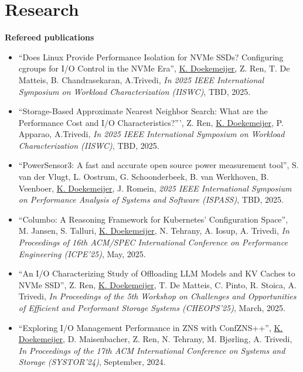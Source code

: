 \documentclass[letterpaper,11pt]{article}
\begin{document}
\section{Research}

\textbf{Refereed publications}
\begin{itemize}[label={}]

\item
  ``Does Linux Provide Performance Isolation for NVMe SSDs? Configuring cgroups for I/O Control in the NVMe Era'', 
  \underline{K. Doekemeijer}, Z. Ren, T. De Matteis, B. Chandrasekaran, A.Trivedi, 
  \textit{In 2025 IEEE International Symposium on Workload Characterization (IISWC)}, 
  TBD, 2025.

\item
  ``Storage-Based Approximate Nearest Neighbor Search: What are the Performance Cost and I/O Characteristics?''', 
  Z. Ren, \underline{K. Doekemeijer},  P. Apparao, A.Trivedi, 
  \textit{In 2025 IEEE International Symposium on Workload Characterization (IISWC)}, 
  TBD, 2025.

\item
  ``PowerSensor3: A fast and accurate open source power measurement tool'', 
  S. van der Vlugt, L. Oostrum, G. Schoonderbeek, B. van Werkhoven, B. Veenboer, \underline{K. Doekemeijer}, J. Romein,
  \textit{2025 IEEE International Symposium on Performance Analysis of Systems and Software (ISPASS)}, 
  TBD, 2025.

\item
  ``Columbo: A Reasoning Framework for Kubernetes’ Configuration Space'', 
  M. Jansen, S. Talluri, \underline{K. Doekemeijer}, N. Tehrany, A. Iosup, A. Trivedi,
  \textit{In Proceedings of 16th ACM/SPEC International Conference on Performance Engineering (ICPE'25)}, 
  May, 2025.

\item
  ``An I/O Characterizing Study of Offloading LLM Models and KV Caches to NVMe SSD'', 
  Z. Ren, \underline{K. Doekemeijer}, T. De Matteis,  C. Pinto, R. Stoica, A. Trivedi,
  \textit{In Proceedings of the 5th Workshop on Challenges and Opportunities of Efficient and Performant Storage Systems (CHEOPS'25)}, 
  March, 2025.

\item
  ``Exploring I/O Management Performance in ZNS with ConfZNS++'', 
  \underline{K. Doekemeijer}, D. Maisenbacher, Z. Ren, N. Tehrany, M. Bjørling, A. Trivedi,
  \textit{In Proceedings of the 17th ACM International Conference on Systems and Storage (SYSTOR'24)}, 
  September, 2024.


\end{itemize}
\end{document}
